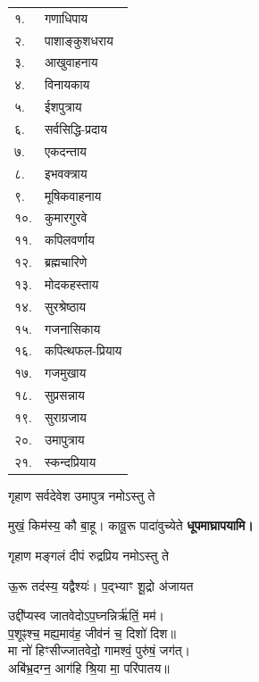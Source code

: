 \begin{center}
\begin{longtable}{ll@{~नमः — दूर्वायुग्मं समर्पयामि।}}
    १. & गणाधिपाय\\
    २. & पाशाङ्कुशधराय\\
    ३. & आखुवाहनाय\\
    ४. & विनायकाय\\
    ५. & ईशपुत्राय\\
    ६. & सर्वसिद्धि-प्रदाय\\
    ७. & एकदन्ताय\\
    ८. & इभवक्त्राय\\
    ९. & मूषिकवाहनाय\\
    १०. & कुमारगुरवे\\
    ११. & कपिलवर्णाय\\
    १२. & ब्रह्मचारिणे\\
    १३. & मोदकहस्ताय\\
    १४. & सुरश्रेष्ठाय\\
    १५. & गजनासिकाय\\
    १६. & कपित्थफल-प्रियाय\\
    १७. & गजमुखाय\\
    १८. & सुप्रसन्नाय\\
    १९. & सुराग्रजाय\\
    २०. & उमापुत्राय\\
    २१. & स्कन्दप्रियाय\\
\end{longtable}

\needspace{3em}
\begingroup
\setlength{\columnseprule}{1pt}
\let\chapt\sect


\endgroup

{गृहाण सर्वदेवेश उमापुत्र नमोऽस्तु ते}

{मुखं॒ किम॑स्य॒ कौ बा॒हू। कावू॒रू पादा॑वुच्येते}
\textbf{\devAya{} धूपमाघ्रापयामि।}
\medskip

{गृहाण मङ्गलं दीपं रुद्रप्रिय नमोऽस्तु ते}

{ऊ॒रू तद॑स्य॒ यद्वैश्यः॑। प॒द्भ्याꣳ शू॒द्रो अ॑जायत}

उद्दी᳚प्यस्व जातवेदोऽप॒घ्नन्निर्ऋ॑तिं॒ मम॑।\\
प॒शूꣴश्च॒ मह्य॒माव॑ह॒ जीव॑नं च॒ दिशो॑ दिश॥\\
मा नो॑ हिꣳसीज्जातवेदो॒ गामश्वं॒ पुरु॑षं॒ जग॑त्।\\
अबि॑भ्र॒दग्न॒ आग॑हि श्रि॒या मा॒ परि॑पातय॥\\


\end{center}

